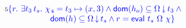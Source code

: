 {\[\begin{array}{l l}
  &  \num{5} \hfill {\specK{\{ r\ldot\, \exists t_3\, t_s\ldot\,
    \histS = t_3 \hpts (x,3) \wedge
    \dom{h_o} \subseteq \sideal{\stableorder}{t_3} \wedge \hbox{}}}\hfill\\
&   \hfill \specK{\phantom{\{ r\ldot\, \exists t_3\, t_s\ldot}\,
    \dom{h} \subseteq \ideal{\stableorder}{t_s} \wedge r = \eval\ t_s\ \stableorder\ \hist\}}\hfill 
\end{array}
\]}


